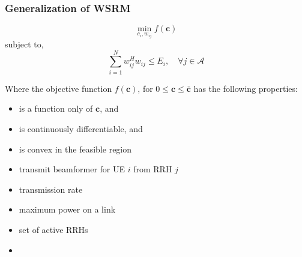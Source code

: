 \documentclass[usenames,dvipsnames]{beamer}
\begin{document}
\begin{frame}
  \frametitle{Generalization of WSRM}
  \vspace*{-.5\baselineskip}
  \begin{exampleblock}{}
    \[
      \min_{c_{i},w_{ij}} f(\mathbf{c})
    \]
    subject to,
    \[
      \sum_{i=1}^{N}w_{ij}^{H}w_{ij}\leq E_{i},\quad \forall j\in \mathcal{A}
    \]
  \end{exampleblock}
  Where the objective function $f(\mathbf{c})$, for $0\leq\mathbf{c}\leq\bar{\mathbf{c}}$ has the following properties:
  \begin{itemize}
    \item { is a function only of $\mathbf{c}$, and}
    \item { is continuously differentiable, and}
    \item { is convex in the feasible region}
    \item { transmit beamformer for UE $i$ from RRH $j$}
    \item { transmission rate}
    \item { maximum power on a link}
    \item { set of active RRHs}
    \item {}
  \end{itemize}
\end{frame}
\end{document}
